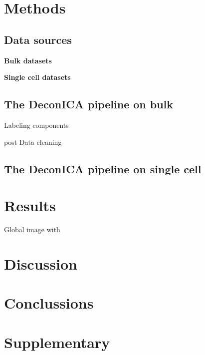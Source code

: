 \documentclass[12pt,]{book}
\theoremstyle{definition}
\theoremstyle{definition}
\theoremstyle{definition}
\theoremstyle{remark}
\begin{document}
\hypertarget{methods-1}{%
\section{Methods}\label{methods-1}}

\hypertarget{data-sources}{%
\subsection{Data sources}\label{data-sources}}

\textbf{Bulk datasets}

\textbf{Single cell datasets}

\hypertarget{the-deconica-pipeline-on-bulk}{%
\subsection{The DeconICA pipeline on
bulk}\label{the-deconica-pipeline-on-bulk}}

Labeling components

post Data cleaning

\hypertarget{the-deconica-pipeline-on-single-cell}{%
\subsection{The DeconICA pipeline on single
cell}\label{the-deconica-pipeline-on-single-cell}}

\hypertarget{results-1}{%
\section{Results}\label{results-1}}

Global image with

\hypertarget{discussion}{%
\section{Discussion}\label{discussion}}

\hypertarget{conclussions}{%
\section{Conclussions}\label{conclussions}}

\hypertarget{supplementary}{%
\section{Supplementary}\label{supplementary}}
\end{document}
